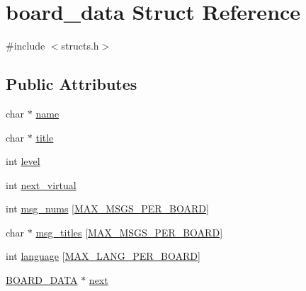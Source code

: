 \hypertarget{structboard__data}{\section{board\-\_\-data Struct Reference}
\label{structboard__data}
}


{\ttfamily \#include $<$structs.\-h$>$}

\subsection*{Public Attributes}
\begin{DoxyCompactItemize}
\item 
char $\ast$ \hyperlink{structboard__data_acabd7c4b13eb5d67fffb95a585538d43}{name}
\item 
char $\ast$ \hyperlink{structboard__data_ad4dcb58b875506d846b7b2f912bc7714}{title}
\item 
int \hyperlink{structboard__data_ae35a14a68901068082fe1f310bf16a87}{level}
\item 
int \hyperlink{structboard__data_afc9080edbaa8808d37f5e2aed71c2518}{next\-\_\-virtual}
\item 
int \hyperlink{structboard__data_ac4159a0b117cd7527cc11903adeb44fb}{msg\-\_\-nums} \mbox{[}\hyperlink{structs_8h_a5912a88669550b45fac4c7d4bc7d20f7}{M\-A\-X\-\_\-\-M\-S\-G\-S\-\_\-\-P\-E\-R\-\_\-\-B\-O\-A\-R\-D}\mbox{]}
\item 
char $\ast$ \hyperlink{structboard__data_adf4dc87ed1aec8daadda29f29daa1835}{msg\-\_\-titles} \mbox{[}\hyperlink{structs_8h_a5912a88669550b45fac4c7d4bc7d20f7}{M\-A\-X\-\_\-\-M\-S\-G\-S\-\_\-\-P\-E\-R\-\_\-\-B\-O\-A\-R\-D}\mbox{]}
\item 
int \hyperlink{structboard__data_aa632c5301705fb2a6769e826929639fb}{language} \mbox{[}\hyperlink{structs_8h_ab7fe780d423de0a7e53a9e8e03afbfde}{M\-A\-X\-\_\-\-L\-A\-N\-G\-\_\-\-P\-E\-R\-\_\-\-B\-O\-A\-R\-D}\mbox{]}
\item 
\hyperlink{structs_8h_a42a06ba95496dda84ff65f3f584fffed}{B\-O\-A\-R\-D\-\_\-\-D\-A\-T\-A} $\ast$ \hyperlink{structboard__data_a634ec853521e8005a4a26ed28c03d63c}{next}
\end{DoxyCompactItemize}


